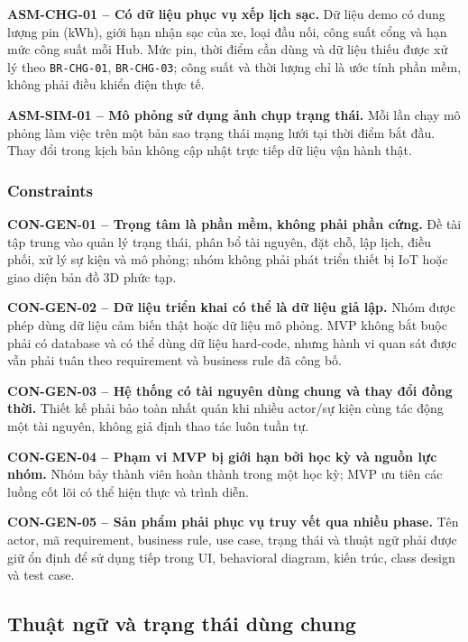 \medskip
\noindent\textbf{ASM-CHG-01 -- Có dữ liệu phục vụ xếp lịch sạc.}
Dữ liệu demo có dung lượng pin (kWh), giới hạn nhận sạc của xe, loại đầu nối, công suất cổng và hạn mức công suất mỗi Hub. Mức pin, thời điểm cần dùng và dữ liệu thiếu được xử lý theo \texttt{BR-CHG-01}, \texttt{BR-CHG-03}; công suất và thời lượng chỉ là ước tính phần mềm, không phải điều khiển điện thực tế.

\medskip
\noindent\textbf{ASM-SIM-01 -- Mô phỏng sử dụng ảnh chụp trạng thái.}
Mỗi lần chạy mô phỏng làm việc trên một bản sao trạng thái mạng lưới tại thời điểm bắt đầu. Thay đổi trong kịch bản không cập nhật trực tiếp dữ liệu vận hành thật.

\subsubsection*{Constraints}

\noindent\textbf{CON-GEN-01 -- Trọng tâm là phần mềm, không phải phần cứng.}
Đề tài tập trung vào quản lý trạng thái, phân bổ tài nguyên, đặt chỗ, lập lịch, điều phối, xử lý sự kiện và mô phỏng; nhóm không phải phát triển thiết bị IoT hoặc giao diện bản đồ 3D phức tạp.

\medskip
\noindent\textbf{CON-GEN-02 -- Dữ liệu triển khai có thể là dữ liệu giả lập.}
Nhóm được phép dùng dữ liệu cảm biến thật hoặc dữ liệu mô phỏng. MVP không bắt buộc phải có database và có thể dùng dữ liệu hard-code, nhưng hành vi quan sát được vẫn phải tuân theo requirement và business rule đã công bố.

\medskip
\noindent\textbf{CON-GEN-03 -- Hệ thống có tài nguyên dùng chung và thay đổi đồng thời.}
Thiết kế phải bảo toàn nhất quán khi nhiều actor/sự kiện cùng tác động một tài nguyên, không giả định thao tác luôn tuần tự.

\medskip
\noindent\textbf{CON-GEN-04 -- Phạm vi MVP bị giới hạn bởi học kỳ và nguồn lực nhóm.}
Nhóm bảy thành viên hoàn thành trong một học kỳ; MVP ưu tiên các luồng cốt lõi có thể hiện thực và trình diễn.

\medskip
\noindent\textbf{CON-GEN-05 -- Sản phẩm phải phục vụ truy vết qua nhiều phase.}
Tên actor, mã requirement, business rule, use case, trạng thái và thuật ngữ phải được giữ ổn định để sử dụng tiếp trong UI, behavioral diagram, kiến trúc, class design và test case.

\subsection{Thuật ngữ và trạng thái dùng chung}

